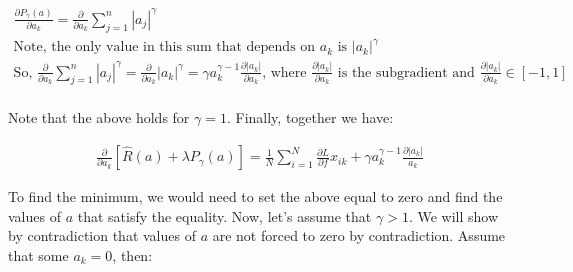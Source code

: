 \documentclass[11pt]{article}
\begin{document}
\begin{gather*}
\frac{\partial P_{\gamma} (a)}{\partial a_{k}} = 
\frac{\partial}{\partial a_{k}} \sum_{j = 1}^{n} |a_{j}|^{\gamma}\\
\text{Note, the only value in this sum that depends on } a_{k} 
\text{ is } |a_{k}|^{\gamma}\\
\text{So, } \frac{\partial}{\partial a_{k}} \sum_{j = 1}^{n} |a_{j}|^{\gamma} = 
\frac{\partial}{\partial a_{k}} |a_{k}|^{\gamma} = 
\gamma a_{k}^{\gamma - 1} \frac{\partial |a_{k}|}{\partial a_{k}} 
\text{, where } \frac{\partial |a_{k}|}{\partial a_{k}} 
\text{ is the subgradient and } 
\frac{\partial |a_{k}|}{\partial a_{k}} \in [-1, 1]\\
\end{gather*}

\newpage

\noindent
Note that the above holds for $\gamma = 1$. Finally, together we have:

\begin{gather*}
\frac{\partial}{\partial a_{k}} [\hat{R}(a) + \lambda P_{\gamma}(a)] = 
\frac{1}{N} \sum_{i = 1}^{N} \frac{\partial L}{\partial f} x_{ik} + 
\gamma a_{k}^{\gamma - 1} \frac{\partial |a_{k}|}{a_{k}}
\end{gather*}

\vspace{5mm}
\noindent
To find the minimum, we would need to set the above equal to zero and find the 
values of $a$ that satisfy the equality. Now, let's assume that $\gamma > 1$. 
We will show by contradiction that values of $a$ are not forced to zero by 
contradiction. Assume that some $a_{k} = 0$, then:
\end{document}

